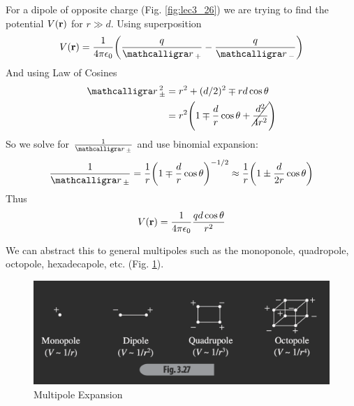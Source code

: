 \documentclass[../main.tex]{subfiles}
\begin{document}
For a dipole of opposite charge (Fig. \ref{fig:lec3_26}) we are trying to
find the potential $V(\vb r)$ for $r \gg d$. Using superposition
\begin{align*}
    V(\vb r) = \ke \qt(
        \frac{q}{\scriptr_+} - \frac{q}{\scriptr_-}
    )
\end{align*}
And using Law of Cosines
\begin{align*}
    \scriptr_{\pm}^2 &= r^2 + (d/2)^2 \mp rd\cos\theta \\
    &= r^2 \qt(
        1 \mp \frac{d}{r} \cos\theta + \cancel{\frac{d^2}{4r^2}}
    )
\end{align*}
So we solve for $\frac{1}{\scriptr_{\pm}}$ and use binomial expansion:
\begin{align*}
    \frac{1}{\scriptr_{\pm}} = \frac{1}{r} \qt(
        1 \mp \frac{d}{r} \cos\theta 
    )^{-1/2}
    \approx \frac{1}{r} \qt(1 \pm \frac{d}{2r} \cos\theta)
\end{align*}
Thus
\begin{align*}
    V(\vb r) = \frac{1}{4\pi\epsilon_0} \frac{qd\cos\theta}{r^2}
\end{align*}

We can abstract this to general multipoles such as the monoponole, quadropole, octopole, hexadecapole, etc. (Fig. \ref{fig:lecture3_27}).

\begin{figure}
    \centering
    \includegraphics[width=0.4\linewidth]{fig3_27.png}
    \caption{Multipole Expansion}
    \label{fig:lecture3_27}
\end{figure}
\end{document}
